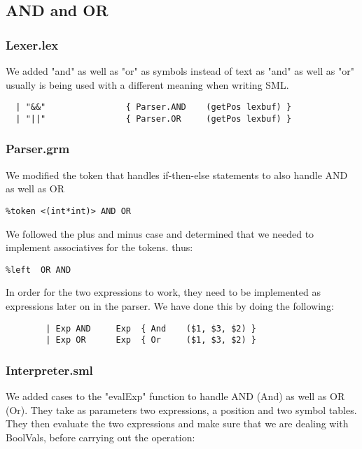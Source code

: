 \documentclass[12pt]{article}
\begin{document}
\subsection{AND and OR}
\subsubsection{Lexer.lex}
We added "and" as well as "or" as symbols instead of text as "and" as well as "or" usually is being used with a different meaning when writing SML.
\begin{verbatim}
  | "&&"                { Parser.AND    (getPos lexbuf) }
  | "||"                { Parser.OR     (getPos lexbuf) }
\end{verbatim}
\subsubsection{Parser.grm}
We modified the token that handles if-then-else statements to also handle AND as well as OR
\begin{verbatim}
%token <(int*int)> AND OR
\end{verbatim}
We followed the plus and minus case and determined that we needed to implement associatives for the tokens.
thus:
\begin{verbatim}
%left  OR AND
\end{verbatim}
In order for the two expressions to work, they need to be implemented as expressions later on in the parser. We have done this by doing the following:
\begin{verbatim}
        | Exp AND     Exp  { And    ($1, $3, $2) }
        | Exp OR      Exp  { Or     ($1, $3, $2) }
\end{verbatim}

\subsubsection{Interpreter.sml}
We added cases to the "evalExp" function to handle AND (And) as well as OR (Or). They take as parameters two expressions, a position and two symbol tables. They then evaluate the two expressions and make sure that we are dealing with BoolVals, before carrying out the operation:
\end{document}
